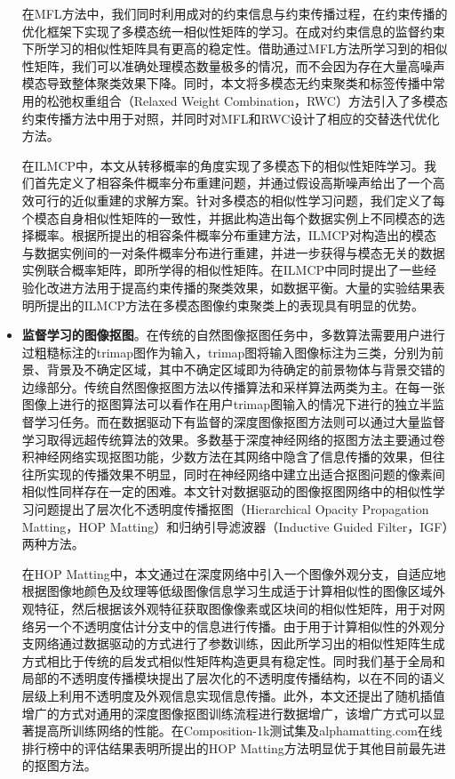 \begin{itemize}
    \indent 在MFL方法中，我们同时利用成对的约束信息与约束传播过程，在约束传播的优化框架下实现了多模态统一相似性矩阵的学习。在成对约束信息的监督约束下所学习的相似性矩阵具有更高的稳定性。借助通过MFL方法所学习到的相似性矩阵，我们可以准确处理模态数量极多的情况，而不会因为存在大量高噪声模态导致整体聚类效果下降。同时，本文将多模态无约束聚类和标签传播中常用的松弛权重组合（Relaxed Weight Combination，RWC）方法引入了多模态约束传播方法中用于对照，并同时对MFL和RWC设计了相应的交替迭代优化方法。

    \indent 在ILMCP中，本文从转移概率的角度实现了多模态下的相似性矩阵学习。我们首先定义了相容条件概率分布重建问题，并通过假设高斯噪声给出了一个高效可行的近似重建的求解方案。针对多模态的相似性学习问题，我们定义了每个模态自身相似性矩阵的一致性，并据此构造出每个数据实例上不同模态的选择概率。根据所提出的相容条件概率分布重建方法，ILMCP对构造出的模态与数据实例间的一对条件概率分布进行重建，并进一步获得与模态无关的数据实例联合概率矩阵，即所学得的相似性矩阵。在ILMCP中同时提出了一些经验化改进方法用于提高约束传播的聚类效果，如数据平衡。大量的实验结果表明所提出的ILMCP方法在多模态图像约束聚类上的表现具有明显的优势。
    \item {\bf{监督学习的图像抠图}}。在传统的自然图像抠图任务中，多数算法需要用户进行过粗糙标注的trimap图作为输入，trimap图将输入图像标注为三类，分别为前景、背景及不确定区域，其中不确定区域即为待确定的前景物体与背景交错的边缘部分。传统自然图像抠图方法以传播算法和采样算法两类为主。在每一张图像上进行的抠图算法可以看作在用户trimap图输入的情况下进行的独立半监督学习任务。而在数据驱动下有监督的深度图像抠图方法则可以通过大量监督学习取得远超传统算法的效果。多数基于深度神经网络的抠图方法主要通过卷积神经网络实现抠图功能，少数方法在其网络中隐含了信息传播的效果\cite{samplenet,cai2019disentangled}，但往往所实现的传播效果不明显，同时在神经网络中建立出适合抠图问题的像素间相似性同样存在一定的困难。本文针对数据驱动的图像抠图网络中的相似性学习问题提出了层次化不透明度传播抠图（Hierarchical Opacity Propagation Matting，HOP Matting）和归纳引导滤波器（Inductive Guided Filter，IGF）两种方法。

    \indent 在HOP Matting中，本文通过在深度网络中引入一个图像外观分支，自适应地根据图像地颜色及纹理等低级图像信息学习生成适于计算相似性的图像区域外观特征，然后根据该外观特征获取图像像素或区块间的相似性矩阵，用于对网络另一个不透明度估计分支中的信息进行传播。由于用于计算相似性的外观分支网络通过数据驱动的方式进行了参数训练，因此所学习出的相似性矩阵生成方式相比于传统的启发式相似性矩阵构造更具有稳定性。同时我们基于全局和局部的不透明度传播模块提出了层次化的不透明度传播结构，以在不同的语义层级上利用不透明度及外观信息实现信息传播。此外，本文还提出了随机插值增广的方式对通用的深度图像抠图训练流程进行数据增广，该增广方式可以显著提高所训练网络的性能。在Composition-1k测试集\cite{xu2017deep}及alphamatting.com在线排行榜\cite{rhemann2009perceptually}中的评估结果表明所提出的HOP Matting方法明显优于其他目前最先进的抠图方法。


\end{itemize}
